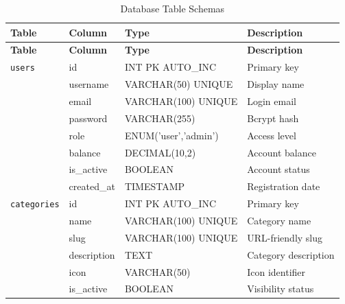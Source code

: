 \documentclass[12pt,a4paper]{report}
\begin{document}
\begin{longtable}{|l|l|l|p{5cm}|}
\caption{Database Table Schemas} \label{tab:schema} \\
\hline
\textbf{Table} & \textbf{Column} & \textbf{Type} & \textbf{Description} \\
\hline
\endfirsthead
\hline
\textbf{Table} & \textbf{Column} & \textbf{Type} & \textbf{Description} \\
\hline
\endhead
\hline
\endfoot

\texttt{users} & id & INT PK AUTO\_INC & Primary key \\
 & username & VARCHAR(50) UNIQUE & Display name \\
 & email & VARCHAR(100) UNIQUE & Login email \\
 & password & VARCHAR(255) & Bcrypt hash \\
 & role & ENUM('user','admin') & Access level \\
 & balance & DECIMAL(10,2) & Account balance \\
 & is\_active & BOOLEAN & Account status \\
 & created\_at & TIMESTAMP & Registration date \\
\hline

\texttt{categories} & id & INT PK AUTO\_INC & Primary key \\
 & name & VARCHAR(100) UNIQUE & Category name \\
 & slug & VARCHAR(100) UNIQUE & URL-friendly slug \\
 & description & TEXT & Category description \\
 & icon & VARCHAR(50) & Icon identifier \\
 & is\_active & BOOLEAN & Visibility status \\
\hline


\end{longtable}
\end{document}
